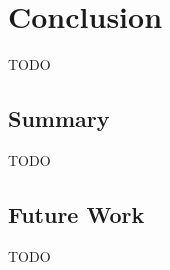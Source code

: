 \chapter{Conclusion}\label{ch:conclusion}

TODO

\section{Summary}\label{sec:concl_summary}

TODO

\section{Future Work}\label{sec:concl_future}

TODO
